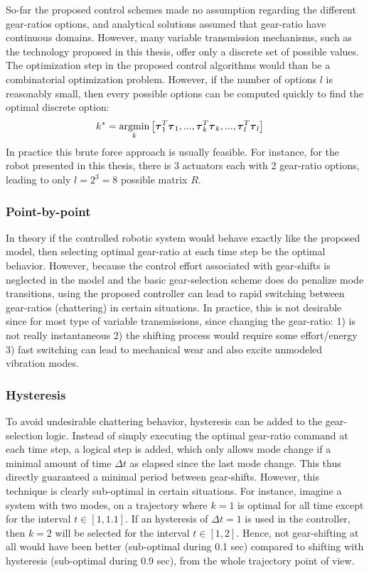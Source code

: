 So-far the proposed control schemes made no assumption regarding the different gear-ratios options, and analytical solutions assumed that gear-ratio have continuous domains. However, many variable transmission mechanisms, such as the technology proposed in this thesis, offer only a discrete set of possible values. The optimization step in the proposed control algorithms would than be a combinatorial optimization problem. However, if the number of options $l$ is reasonably small, then every possible options can be computed quickly to find the optimal discrete option:
%
\begin{align}
k^{*} &= \operatornamewithlimits{argmin}\limits_{k} \left[  \vec{\tau}_1^T\vec{\tau}_1  , ... , \vec{\tau}_k^T\vec{\tau}_k , ...  , \vec{\tau}_l^T\vec{\tau}_l \right]
\end{align}
%
In practice this brute force approach is usually feasible. For instance, for the robot presented in this thesis, there is 3 actuators each with 2 gear-ratio options, leading to only $l=2^3=8$ possible matrix $R$.

\subsubsection{Point-by-point}

In theory if the controlled robotic system would behave exactly like the proposed model, then selecting optimal gear-ratio at each time step be the optimal behavior. However, because the control effort associated with gear-shifts is neglected in the model and the basic gear-selection scheme does do penalize mode transitions, using the proposed controller can lead to rapid switching between gear-ratios (chattering) in certain situations. In practice, this is not desirable since for most type of variable transmissions, since changing the gear-ratio: 1) is not really instantaneous 2) the shifting process would require some effort/energy 3) fast switching can lead to mechanical wear and also excite unmodeled vibration modes. 

\subsubsection{Hysteresis}

To avoid undesirable chattering behavior, hysteresis can be added to the gear-selection logic. Instead of simply executing the optimal gear-ratio command at each time step, a logical step is added, which only allows mode change if a minimal amount of time $\Delta t$ as elapsed since the last mode change. This thus directly guaranteed a minimal period between gear-shifts. However, this technique is clearly sub-optimal in certain situations. For instance, imagine a system with two modes, on a trajectory where $k=1$ is optimal for all time except for the interval $t\in[1,1.1]$. If an hysteresis of $\Delta t = 1$ is used in the controller, then $k=2$ will be selected for the interval $t\in[1,2]$. Hence, not gear-shifting at all would have been better (sub-optimal during 0.1 sec) compared to shifting with hysteresis (sub-optimal during 0.9 sec), from the whole trajectory point of view. 

